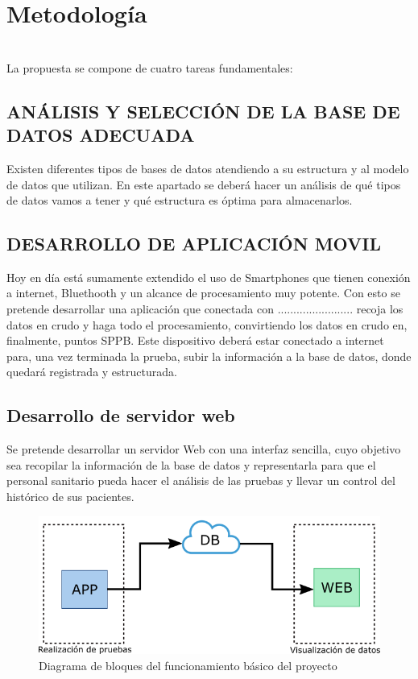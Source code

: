 \documentclass[12pt,oneside,a4paper]{article}
\begin{document}
\section{Metodología} \\
\hline
La propuesta se compone de cuatro tareas fundamentales: 

\subsection{ANÁLISIS Y SELECCIÓN DE LA BASE DE DATOS ADECUADA}
Existen diferentes tipos de bases de datos atendiendo a su estructura y al modelo de datos que utilizan. En este apartado se deberá hacer un análisis de qué tipos de datos vamos a tener y qué estructura es óptima para almacenarlos.

\subsection{DESARROLLO DE APLICACIÓN MOVIL}
Hoy en día está sumamente extendido el uso de Smartphones que tienen conexión a internet, Bluethooth y un alcance de procesamiento muy potente. Con esto se pretende desarrollar una aplicación que conectada con ........................ recoja los datos en crudo y haga todo el procesamiento, convirtiendo los datos en crudo en, finalmente, puntos SPPB. Este dispositivo deberá estar conectado a internet para, una vez terminada la prueba, subir la información a la base de datos, donde quedará registrada y estructurada.

\subsection{Desarrollo de servidor web} 
Se pretende desarrollar un servidor Web con una interfaz sencilla, cuyo objetivo sea recopilar la información de la base de datos y representarla para que el personal sanitario pueda hacer el análisis de las pruebas y llevar un control del histórico de sus pacientes.

\begin{figure}[H]
  \centering
  \includegraphics[width=15cm]{anteproyecto/figuras/tfg_diagramabloques_simple.png}
  \caption{Diagrama de bloques del funcionamiento básico del proyecto}
  \label{fig:ejemplo}
\end{figure}
\end{document}
